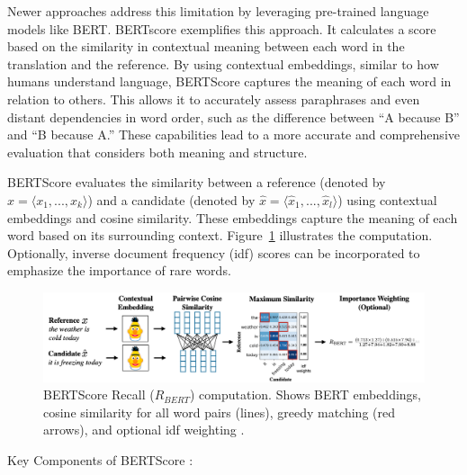 {{Newer approaches address this limitation by leveraging pre-trained language models like BERT. BERTscore \parencite{zhang2020bertscore} exemplifies this approach. It calculates a score based on the similarity in contextual meaning between each word in the translation and the reference. By using contextual embeddings, similar to how humans understand language, BERTScore captures the meaning of each word in relation to others. This allows it to accurately assess paraphrases and even distant dependencies in word order, such as the difference between ``A because B'' and ``B because A.'' These capabilities lead to a more accurate and comprehensive evaluation that considers both meaning and structure.

BERTScore evaluates the similarity between a reference (denoted by $x = ⟨x_1, ..., x_k⟩$) and a candidate (denoted by $\hat{x} = ⟨\hat{x}_1, ..., \hat{x}_l⟩$) using contextual embeddings and cosine similarity. These embeddings capture the meaning of each word based on its surrounding context. Figure~\ref{fig: bertscore} illustrates the computation. Optionally, inverse document frequency (idf) scores can be incorporated to emphasize the importance of rare words.

\begin{figure}[htb]
\centering
\includegraphics[width=1\textwidth]{textual/Figuras/bertscore.png}
\caption{BERTScore Recall ($R_{BERT}$) computation. Shows BERT embeddings, cosine similarity for all word pairs (lines), greedy matching (red arrows), and optional idf weighting \parencite{zhang2020bertscore}.} 
\label{fig: bertscore} 
\end{figure}

Key Components of BERTScore \parencite{zhang2020bertscore}:

}}
